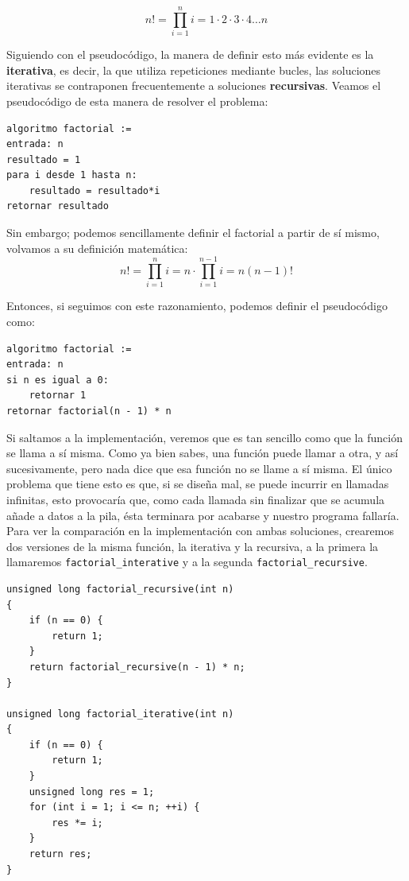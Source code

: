 \documentclass[a4paper]{article}
\begin{document}
$$
n! = \prod^{n}_{i=1}{i}= 1\!\cdot\!2\!\cdot\!3\!\cdot\!4\dots{}n
$$

Siguiendo con el pseudocódigo, la manera de definir esto más evidente
es la \textbf{iterativa}, es decir, la que utiliza repeticiones mediante
bucles, las soluciones iterativas se contraponen frecuentemente a soluciones
\textbf{recursivas}. Veamos el pseudocódigo de esta manera de resolver el
problema:


\begin{lstlisting}[style=pseudoCode]
algoritmo factorial :=
entrada: n
resultado = 1
para i desde 1 hasta n:
    resultado = resultado*i
retornar resultado
\end{lstlisting}

Sin embargo; podemos sencillamente definir el factorial a partir de sí mismo,
volvamos a su definición matemática:
$$
n! = \prod^{n}_{i=1}{i}= n\!\cdot\!\!\prod^{n-1}_{i=1}{i} = n\left(n-1\right)!
$$

Entonces, si seguimos con este razonamiento, podemos definir el pseudocódigo
como:

\begin{lstlisting}[style=pseudoCode]
algoritmo factorial :=
entrada: n
si n es igual a 0:
    retornar 1
retornar factorial(n - 1) * n
\end{lstlisting}

Si saltamos a la implementación, veremos que es tan sencillo como que la función
se llama a sí misma. Como ya bien sabes, una función puede llamar a otra, y así
sucesivamente, pero nada dice que esa función no se llame a sí misma. El
único problema que tiene esto es que, si se diseña mal, se puede incurrir en
llamadas infinitas, esto provocaría que, como cada llamada sin finalizar
que se acumula añade a datos a la pila, ésta terminara por acabarse y nuestro
programa fallaría.
Para ver la comparación en la implementación con ambas soluciones, crearemos
dos versiones de la misma función, la iterativa y la recursiva, a la primera
la llamaremos \texttt{factorial\_interative} y a la segunda
\texttt{factorial\_recursive}.


\noindent
\begin{minipage}[H]{\linewidth}
\mbox{}
\begin{lstlisting}[style=C, caption={Ejemplo final de variables},
label={lst:factorialIterativeVsRecursive}]
unsigned long factorial_recursive(int n)
{
    if (n == 0) {
        return 1;
    }
    return factorial_recursive(n - 1) * n;
}

unsigned long factorial_iterative(int n)
{
    if (n == 0) {
        return 1;
    }
    unsigned long res = 1;
    for (int i = 1; i <= n; ++i) {
        res *= i;
    }
    return res;
}
\end{lstlisting}
\end{minipage}
\end{document}
